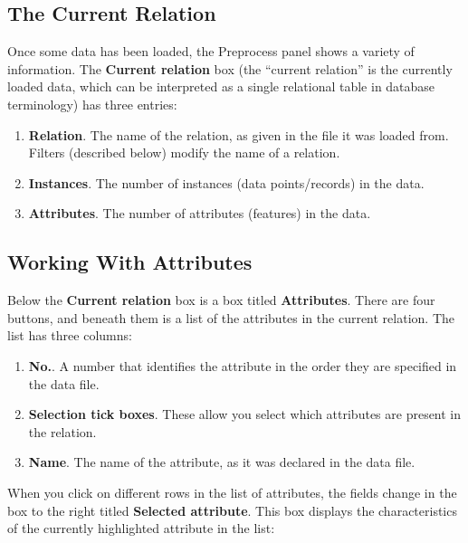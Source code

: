\subsection{The Current Relation}

Once some data has been loaded, the Preprocess panel shows a variety
of information.  The \textbf{Current relation} box (the ``current
relation'' is the currently loaded data, which can be interpreted as a
single relational table in database terminology)  has three entries:

\begin{enumerate}
\item \textbf{Relation}.
The name of the relation, as given in the file it was loaded from. Filters
(described below) modify the name of a relation. 
\item \textbf{Instances}.
The number of instances (data points/records) in the data.
\item \textbf{Attributes}.
The number of attributes (features) in the data.
\end{enumerate}

\subsection{Working With Attributes}

Below the \textbf{Current relation} box is a box titled \textbf{Attributes}.
There are four buttons, and beneath them is a list of the attributes in the
current relation. The list has three columns:

\begin{enumerate}
\item \textbf{No.}.
A number that identifies the attribute in the order they are specified in the
data file. 
\item \textbf{Selection tick boxes}.
These allow you select which attributes are present in the relation.
\item \textbf{Name}.
The name of the attribute, as it was declared in the data file.
\end{enumerate}

When you click on different rows in the list of attributes, the fields
change in the box to the right titled \textbf{Selected
attribute}. This box displays the characteristics of the currently
highlighted attribute in the list:

